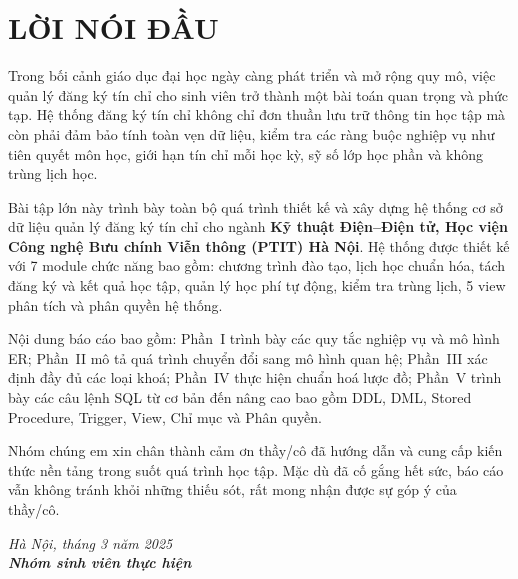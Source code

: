 \documentclass[13pt, a4paper]{article}
\begin{document}



\newpage
\section*{LỜI NÓI ĐẦU}

\noindent Trong bối cảnh giáo dục đại học ngày càng phát triển và mở rộng quy mô, việc quản lý đăng ký tín chỉ cho sinh viên trở thành một bài toán quan trọng và phức tạp. Hệ thống đăng ký tín chỉ không chỉ đơn thuần lưu trữ thông tin học tập mà còn phải đảm bảo tính toàn vẹn dữ liệu, kiểm tra các ràng buộc nghiệp vụ như tiên quyết môn học, giới hạn tín chỉ mỗi học kỳ, sỹ số lớp học phần và không trùng lịch học.

\vspace{0.4cm}
\noindent Bài tập lớn này trình bày toàn bộ quá trình thiết kế và xây dựng hệ thống cơ sở dữ liệu quản lý đăng ký tín chỉ cho ngành \textbf{Kỹ thuật Điện--Điện tử, Học viện Công nghệ Bưu chính Viễn thông (PTIT) Hà Nội}. Hệ thống được thiết kế với 7 module chức năng bao gồm: chương trình đào tạo, lịch học chuẩn hóa, tách đăng ký và kết quả học tập, quản lý học phí tự động, kiểm tra trùng lịch, 5 view phân tích và phân quyền hệ thống.

\vspace{0.4cm}
\noindent Nội dung báo cáo bao gồm: Phần~I trình bày các quy tắc nghiệp vụ và mô hình ER; Phần~II mô tả quá trình chuyển đổi sang mô hình quan hệ; Phần~III xác định đầy đủ các loại khoá; Phần~IV thực hiện chuẩn hoá lược đồ; Phần~V trình bày các câu lệnh SQL từ cơ bản đến nâng cao bao gồm DDL, DML, Stored Procedure, Trigger, View, Chỉ mục và Phân quyền.

\vspace{0.4cm}
\noindent Nhóm chúng em xin chân thành cảm ơn thầy/cô đã hướng dẫn và cung cấp kiến thức nền tảng trong suốt quá trình học tập. Mặc dù đã cố gắng hết sức, báo cáo vẫn không tránh khỏi những thiếu sót, rất mong nhận được sự góp ý của thầy/cô.

\vspace{1cm}
\begin{flushright}
  \itshape Hà Nội, tháng 3 năm 2025 \\
  \bfseries Nhóm sinh viên thực hiện
\end{flushright}
\end{document}
